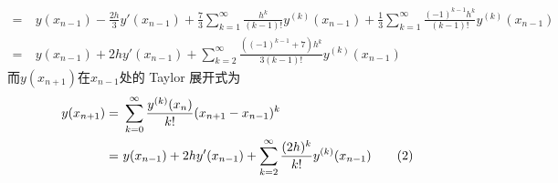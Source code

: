 \documentclass[11pt]{article}
\begin{document}
\begin{question}
{\begin{align*}
            =\            & y(x_{n - 1}) - \frac{2h}{3}y'(x_{n - 1}) + \frac{7}{3}\sum_{k = 1}^{\infty}\frac{h^k}{(k - 1)!}y^{(k)}(x_{n - 1}) + \frac{1}{3}\sum_{k = 1}^{\infty}\frac{(-1)^{k - 1}h^k}{(k - 1)!}y^{(k)}(x_{n - 1}) \\
            =\            & y(x_{n - 1}) + 2hy'(x_{n - 1}) + \sum_{k = 2}^{\infty}\frac{\left((-1)^{k - 1} + 7\right)h^k}{3(k - 1)!}y^{(k)}(x_{n - 1})
        \end{align*}
        而$y(x_{n + 1})$在$x_{n - 1}$处的 Taylor 展开式为
        \begin{align}
            y(x_{n + 1}) =\  & \sum_{k = 0}^{\infty}\frac{y^{(k)}(x_{n})}{k!}(x_{n + 1} - x_{n - 1})^k                                            \notag \\
            =\               & y(x_{n - 1}) + 2hy'(x_{n - 1}) + \sum_{k = 2}^{\infty}\frac{(2h)^k}{k!}y^{(k)}(x_{n - 1}) \tag{2} \label{taylor-1}
        \end{align}
}
\end{question}
\end{document}
